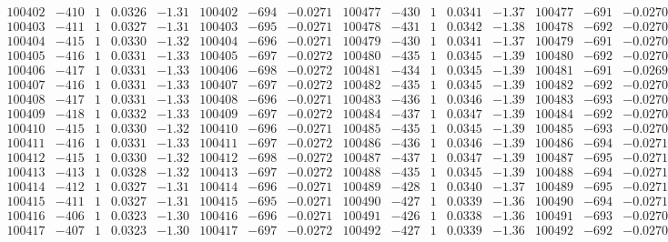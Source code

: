 \documentclass[11pt,reqno,a4letter]{article}
\numberwithin{figure}{section}
\numberwithin{table}{section}
\theoremstyle{plain}
\numberwithin{theorem}{section}
\theoremstyle{definition}
\begin{document}
\begin{table}[ht!]
\begin{equation*}
{\begin{array}{ccccc|ccc||ccccc|ccc}
100402 & -410 & 1 & 0.0326 & -1.31 & 100402 & -694 & -0.0271 & 100477 & -430 & 1 & 0.0341 & -1.37 & 100477 & -691 & -0.0270  \\
100403 & -411 & 1 & 0.0327 & -1.31 & 100403 & -695 & -0.0271 & 100478 & -431 & 1 & 0.0342 & -1.38 & 100478 & -692 & -0.0270  \\
100404 & -415 & 1 & 0.0330 & -1.32 & 100404 & -696 & -0.0271 & 100479 & -430 & 1 & 0.0341 & -1.37 & 100479 & -691 & -0.0270  \\
100405 & -416 & 1 & 0.0331 & -1.33 & 100405 & -697 & -0.0272 & 100480 & -435 & 1 & 0.0345 & -1.39 & 100480 & -692 & -0.0270  \\
100406 & -417 & 1 & 0.0331 & -1.33 & 100406 & -698 & -0.0272 & 100481 & -434 & 1 & 0.0345 & -1.39 & 100481 & -691 & -0.0269  \\
100407 & -416 & 1 & 0.0331 & -1.33 & 100407 & -697 & -0.0272 & 100482 & -435 & 1 & 0.0345 & -1.39 & 100482 & -692 & -0.0270  \\
100408 & -417 & 1 & 0.0331 & -1.33 & 100408 & -696 & -0.0271 & 100483 & -436 & 1 & 0.0346 & -1.39 & 100483 & -693 & -0.0270  \\
100409 & -418 & 1 & 0.0332 & -1.33 & 100409 & -697 & -0.0272 & 100484 & -437 & 1 & 0.0347 & -1.39 & 100484 & -692 & -0.0270  \\
100410 & -415 & 1 & 0.0330 & -1.32 & 100410 & -696 & -0.0271 & 100485 & -435 & 1 & 0.0345 & -1.39 & 100485 & -693 & -0.0270  \\
100411 & -416 & 1 & 0.0331 & -1.33 & 100411 & -697 & -0.0272 & 100486 & -436 & 1 & 0.0346 & -1.39 & 100486 & -694 & -0.0271  \\
100412 & -415 & 1 & 0.0330 & -1.32 & 100412 & -698 & -0.0272 & 100487 & -437 & 1 & 0.0347 & -1.39 & 100487 & -695 & -0.0271  \\
100413 & -413 & 1 & 0.0328 & -1.32 & 100413 & -697 & -0.0272 & 100488 & -435 & 1 & 0.0345 & -1.39 & 100488 & -694 & -0.0271  \\
100414 & -412 & 1 & 0.0327 & -1.31 & 100414 & -696 & -0.0271 & 100489 & -428 & 1 & 0.0340 & -1.37 & 100489 & -695 & -0.0271  \\
100415 & -411 & 1 & 0.0327 & -1.31 & 100415 & -695 & -0.0271 & 100490 & -427 & 1 & 0.0339 & -1.36 & 100490 & -694 & -0.0271  \\
100416 & -406 & 1 & 0.0323 & -1.30 & 100416 & -696 & -0.0271 & 100491 & -426 & 1 & 0.0338 & -1.36 & 100491 & -693 & -0.0270  \\
100417 & -407 & 1 & 0.0323 & -1.30 & 100417 & -697 & -0.0272 & 100492 & -427 & 1 & 0.0339 & -1.36 & 100492 & -692 & -0.0270  \\

\end{array}}
\end{equation*}
\end{table}
\end{document}
